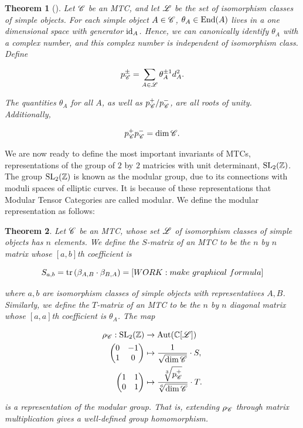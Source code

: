 \documentclass{article}
\newtheorem{theorem}{Theorem}[section]
\theoremstyle{definition}
\numberwithin{figure}{section}
\begin{document}
\begin{theorem}[\cite{vafa1988toward}] Let $\mathscr{C}$ be an MTC, and let $\mathscr{L}$ be the set of isomorphism classes of simple objects. For each simple object $A\in \mathscr{C}$, $\theta_A\in \mathrm{End}(A)$ lives in a one dimensional space with generator $\mathrm{id}_A$. Hence, we can canonically identify $\theta_A$ with a complex number, and this complex number is independent of isomorphism class. Define

$$p^{\pm}_{\mathscr{C}}=\sum_{A\in \mathscr{L}}\theta_A^{\pm 1}d_A^2.$$

The quantities $\theta_A$ for all $A$, as well as $p^{+}_{\mathscr{C}}/p^{-}_{\mathscr{C}}$, are all roots of unity. Additionally,

$$p^{+}_{\mathscr{C}}p^{-}_{\mathscr{C}}=\dim \mathscr{C}.$$
\end{theorem}

We are now ready to define the most important invariants of MTCs, representations of the group of $2$ by $2$ matricies with unit determinant, $\mathrm{SL}_2(\mathbb{Z})$. The group $\mathrm{SL}_2(\mathbb{Z})$ is known as the modular group, due to its connections with moduli spaces of elliptic curves. It is because of these representations that Modular Tensor Categories are called modular. We define the modular representation as follows:

\begin{theorem} Let $\mathscr{C}$ be an MTC, whose set $\mathscr{L}$ of isomorphism classes of simple objects has $n$ elements. We define the $S$-matrix of an MTC to be the $n$ by $n$ matrix whose $[a,b]$th coefficient is

$$S_{a,b}=\mathrm{tr}\left(\beta_{A,B}\cdot \beta_{B,A}\right)=[WORK: make \,\, graphical \,\, formula]$$

where $a,b$ are isomorphism classes of simple objects with representatives $A,B$. Similarly, we define the $T$-matrix of an MTC to be the $n$ by $n$ diagonal matrix whose $[a,a]$th coefficient is $\theta_A$. The map

\begin{align*}
\rho_{\mathscr{C}}: \mathrm{SL}_2(\mathbb{Z})&\xrightarrow{} \mathrm{Aut}(\mathbb{C}[\mathscr{L}])\\
\begin{pmatrix}
0 & -1\\
1 & 0
\end{pmatrix}
&\mapsto \frac{1}{\sqrt{\dim \mathscr{C} }}\cdot S, \\
\begin{pmatrix}
1 & 1\\
0 & 1
\end{pmatrix}
&\mapsto \frac{\sqrt[3]{p^+_{\mathscr{C}}}}{\sqrt[6]{\dim \mathscr{C} }}\cdot T.
\end{align*}

is a representation of the modular group. That is, extending $\rho_{\mathscr{C}}$ through matrix multiplication gives a well-defined group homomorphism.
\end{theorem}
\end{document}
